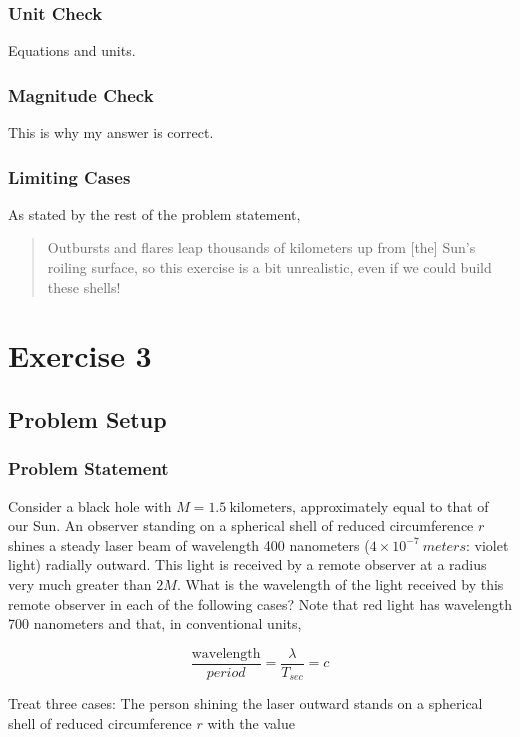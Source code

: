 \documentclass[]{report}
\begin{document}
      \subsection{Unit Check}
        Equations and units.

      \subsection{Magnitude Check}
        This is why my answer is correct.

      \subsection{Limiting Cases}
        As stated by the rest of the problem statement,

        \begin{quote}
          Outbursts and flares leap thousands of kilometers up from [the] Sun's roiling surface, so this exercise is a bit unrealistic, even if we could build these shells!
          \end{quote}

  \chapter{Exercise 3}
    \section{Problem Setup}
      \subsection{Problem Statement}
        Consider a black hole with $M=1.5\ \text{kilometers}$, approximately equal to that of our Sun. An observer standing on a spherical shell of reduced circumference $r$ shines a steady laser beam of wavelength 400 nanometers ($4\times10^{-7}\ meters$: violet light) radially outward. This light is received by a remote observer at a radius very much greater than $2M$. What is the wavelength of the light received by this remote observer in each of the following cases? Note that red light has wavelength 700 nanometers and that, in conventional units,

        $$\frac{\text{wavelength}}{period}=\frac{\lambda}{T_{sec}}=c$$

        Treat three cases: The person shining the laser outward stands on a spherical shell of reduced circumference $r$ with the value
\end{document}
